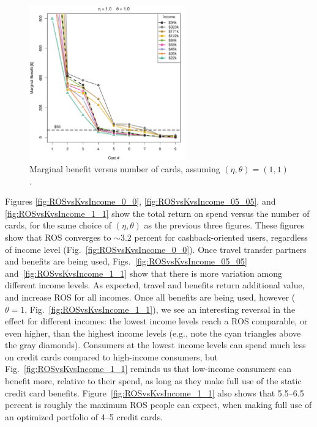 \begin{figure}[tbh]
    \begin{center}
    \includegraphics[width=0.6\textwidth]{../Figures/MBvsKvsIncome_1_1.pdf}
    \caption{Marginal benefit versus number of cards, assuming $(\eta, \theta) = (1,1)$.}
    \label{fig:MBvsKvsIncome_1_1}
    \end{center}
\end{figure}

Figures \ref{fig:ROSvsKvsIncome_0_0}, \ref{fig:ROSvsKvsIncome_05_05}, and \ref{fig:ROSvsKvsIncome_1_1} show the total return on spend versus the number of cards, for the same choice of $(\eta, \theta)$ as the previous three figures. 
These figures show that ROS converges to $\sim3.2$ percent for cashback-oriented users, regardless of income level (Fig.~\ref{fig:ROSvsKvsIncome_0_0}).
Once travel transfer partners and benefits are being used, Figs.~\ref{fig:ROSvsKvsIncome_05_05} and~\ref{fig:ROSvsKvsIncome_1_1} show that there is more variation among different income levels. 
As expected, travel and benefits return additional value, and increase ROS for all incomes.
Once all benefits are being used, however ($\theta = 1$, Fig.~\ref{fig:ROSvsKvsIncome_1_1}), we see an interesting reversal in the effect for different incomes: the lowest income levels reach a ROS comparable, or even higher, than the highest income levels (e.g., note the cyan triangles above the gray diamonds). 
Consumers at the lowest income levels can spend much less on credit cards compared to high-income consumers, but Fig.~\ref{fig:ROSvsKvsIncome_1_1} reminds us that low-income consumers can benefit more, relative to their spend, as long as they make full use of the static credit card benefits.
Figure~\ref{fig:ROSvsKvsIncome_1_1} also shows that 5.5--6.5 percent is roughly the maximum ROS people can expect, when making full use of an optimized portfolio of 4--5 credit cards.
 
